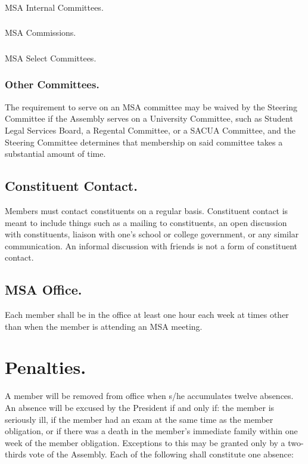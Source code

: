 \documentclass{rules}
\begin{document}
\subsubsection{}
MSA Internal Committees.
\subsubsection{}
MSA Commissions.
\subsubsection{}
MSA Select Committees.
\subsubsection{Other Committees.}
The requirement to serve on an MSA committee may be waived by the Steering Committee if the Assembly serves on a University Committee, such as Student Legal Services Board, a Regental Committee, or a SACUA Committee, and the Steering Committee determines that membership on said committee takes a substantial amount of time.
\subsection{Constituent Contact.}
Members must contact constituents on a regular basis. Constituent contact is meant to include things such as a mailing to constituents, an open discussion with constituents, liaison with one's school or college government, or any similar communication. An informal discussion with friends is not a form of constituent contact.
\subsection{MSA Office.}
Each member shall be in the office at least one hour each week at times other than when the member is attending an MSA meeting.

\section{Penalties.}
A member will be removed from office when s/he accumulates twelve absences. An absence will be excused by the President if and only if: the member is seriously ill, if the member had an exam at the same time as the member obligation, or if there was a death in the member's immediate family within one week of the member obligation. Exceptions to this may be granted only by a two-thirds vote of the Assembly. Each of the following shall constitute one absence:
\end{document}
